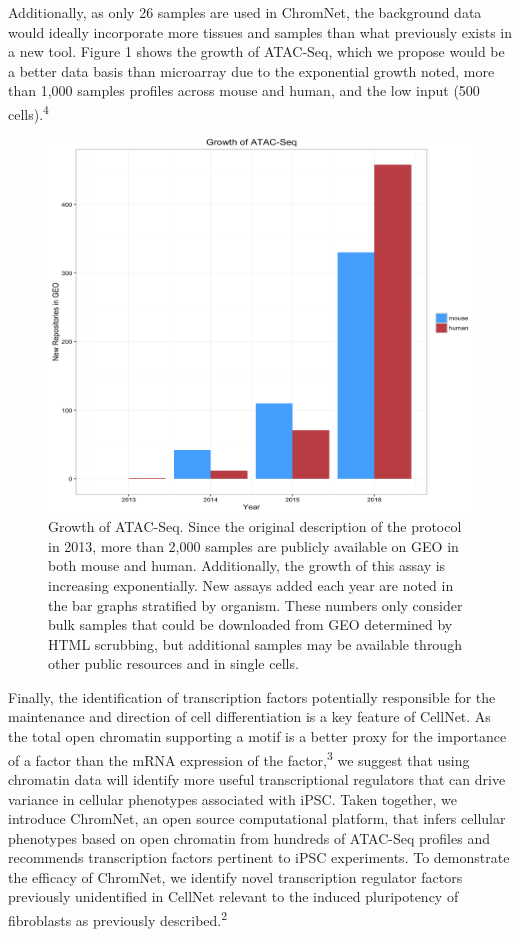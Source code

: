 \documentclass[12pt]{article}
\begin{document}
Additionally, as only 26 samples are used in ChromNet, the background data would ideally incorporate more tissues and samples than what previously exists in a new tool. Figure 1 shows the growth of ATAC-Seq, which we propose would be a better data basis than microarray due to the exponential growth noted, more than 1,000 samples profiles across mouse and human, and the low input (500 cells).\textsuperscript{4}

\begin{figure}
\caption{Growth of ATAC-Seq. Since the original description of the protocol in 2013, more than 2,000 samples are publicly available on GEO in both mouse and human. Additionally, the growth of this assay is increasing exponentially. New assays added each year are noted in the bar graphs stratified by organism. These numbers only consider bulk samples that could be downloaded from GEO determined by HTML scrubbing, but additional samples may be available through other public resources and in single cells. }
\includegraphics[scale=0.45]{atac_growth.png}
\end{figure}

Finally, the identification of transcription factors potentially responsible for the maintenance and direction of cell differentiation is a key feature of CellNet. As the total open chromatin supporting a motif is a better proxy for the importance of a factor than the mRNA expression of the factor,\textsuperscript{3} we suggest that using chromatin data will identify more useful transcriptional regulators that can drive variance in cellular phenotypes associated with iPSC. Taken together, we introduce ChromNet, an open source computational platform, that infers cellular phenotypes based on open chromatin from hundreds of ATAC-Seq profiles and recommends transcription factors pertinent to iPSC experiments. To demonstrate the efficacy of ChromNet, we identify novel transcription regulator factors previously unidentified in CellNet relevant to the induced pluripotency of fibroblasts as previously described.\textsuperscript{2} \newpage
\end{document}
